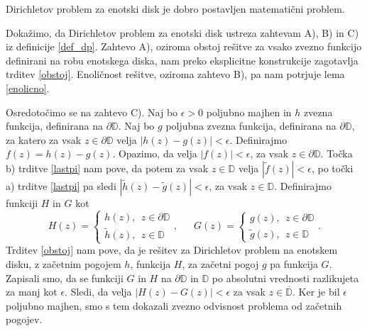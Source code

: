 \documentclass[mat1, tisk]{fmfdelo}
\begin{document}
    \begin{posledica}
        Dirichletov problem za enotski disk je dobro postavljen matematični problem. 
    \end{posledica}
    \begin{dokaz}
        Dokažimo, da Dirichletov problem za enotski disk ustreza zahtevam A), B) in C) iz definicije \ref{def_dp}.
        Zahtevo A), oziroma obstoj rešitve za vsako zvezno funkcijo definirani na robu enotskega diska, nam preko eksplicitne konstrukcije zagotavlja trditev \ref{obstoj}. Enoličnost rešitve, oziroma zahtevo B), pa nam potrjuje lema \ref{enolicno}. 
        
        Osredotočimo se na zahtevo C). 
        Naj bo $\epsilon > 0$ poljubno majhen in $h$ zvezna funkcija, definirana na $\partial \mathbb{D}$. 
        Naj bo $g$ poljubna zvezna funkcija, definirana na $\partial \mathbb{D}$, za katero za vsak $z \in \partial \mathbb{D}$ velja $|h(z) - g(z)| < \epsilon$. 
        Definirajmo \mbox{$f(z) = h(z) - g(z)$}. Opazimo, da velja $|f(z)| < \epsilon$, za vsak $z \in \partial \mathbb{D}$. Točka b) trditve \ref{lastpi} nam pove, da potem za vsak $z \in \mathbb{D}$ velja $|\widetilde{f}(z)| < \epsilon$, po točki a) trditve \ref{lastpi} pa sledi \mbox{$|\widetilde{h}(z) - \widetilde{g}(z)| < \epsilon$}, za vsak $z \in \mathbb{D}$.
        Definirajmo funkciji $H$ in $G$ kot
        $$
            H(z) = \begin{cases}
                    h(z),~~z \in \partial \mathbb{D}\\
                    \widetilde{h}(z),~~z \in \mathbb{D}
            \end{cases},~~~~~~~
            G(z) = \begin{cases}
                g(z),~~z \in \partial \mathbb{D}\\
                \widetilde{g}(z),~~z \in \mathbb{D}
            \end{cases}.
        $$
        Trditev \ref{obstoj} nam pove, da je rešitev za Dirichletov problem na enotskem disku, z začetnim pogojem $h$, funkcija $H$, za začetni pogoj $g$ pa funkcija $G$.
        Zapisali smo, da se funkciji $G$ in $H$ na $\partial \mathbb{D}$ in $\mathbb{D}$ po absolutni vrednosti razlikujeta za manj kot $\epsilon$. Sledi, da velja $|H(z) - G(z)| < \epsilon$ za vsak $z \in \overline{\mathbb{D}}$.     
        Ker je bil $\epsilon$ poljubno majhen, smo s tem dokazali zvezno odvisnost problema od začetnih pogojev.
    \end{dokaz}
\end{document}
